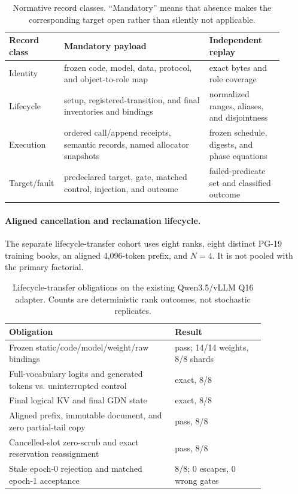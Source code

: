 \documentclass{article}
\begin{document}
\begin{table}[H]
  \caption{Normative record classes.  ``Mandatory'' means that absence makes
  the corresponding target open rather than silently not applicable.}
  \label{tab:normative-records}
  \centering\footnotesize
  \begin{tabular}{@{}p{0.14\linewidth}p{0.51\linewidth}p{0.26\linewidth}@{}}
    \toprule
    Record class & Mandatory payload & Independent replay \tabularnewline
    \midrule
    Identity & frozen code, model, data, protocol, and object-to-role map & exact bytes and role coverage \\
    Lifecycle & setup, registered-transition, and final inventories and bindings & normalized ranges, aliases, and disjointness \\
    Execution & ordered call/append receipts, semantic records, named allocator snapshots & frozen schedule, digests, and phase equations \\
    Target/fault & predeclared target, gate, matched control, injection, and outcome & failed-predicate set and classified outcome \\
    \bottomrule
  \end{tabular}
\end{table}

\paragraph{Aligned cancellation and reclamation lifecycle.}
The separate lifecycle-transfer cohort uses eight ranks, eight distinct PG-19
training books, an aligned 4,096-token prefix, and $N=4$.  It is not pooled
with the primary factorial.

\begin{table}[H]
\caption{Lifecycle-transfer obligations on the existing Qwen3.5/vLLM Q16
adapter.  Counts are deterministic rank outcomes, not stochastic replicates.}
\label{tab:lifecycle-transfer}
\centering\small
\begin{tabular}{@{}p{0.55\linewidth}p{0.30\linewidth}@{}}
\toprule
Obligation & Result \\
\midrule
Frozen static/code/model/weight/raw bindings & pass; 14/14 weights, 8/8 shards \\
Full-vocabulary logits and generated tokens vs. uninterrupted control & exact, 8/8 \\
Final logical KV and final GDN state & exact, 8/8 \\
Aligned prefix, immutable document, and zero partial-tail copy & pass, 8/8 \\
Cancelled-slot zero-scrub and exact reservation reassignment & pass, 8/8 \\
Stale epoch-0 rejection and matched epoch-1 acceptance & 8/8; 0 escapes, 0 wrong gates \\
\bottomrule
\end{tabular}
\end{table}
\end{document}
